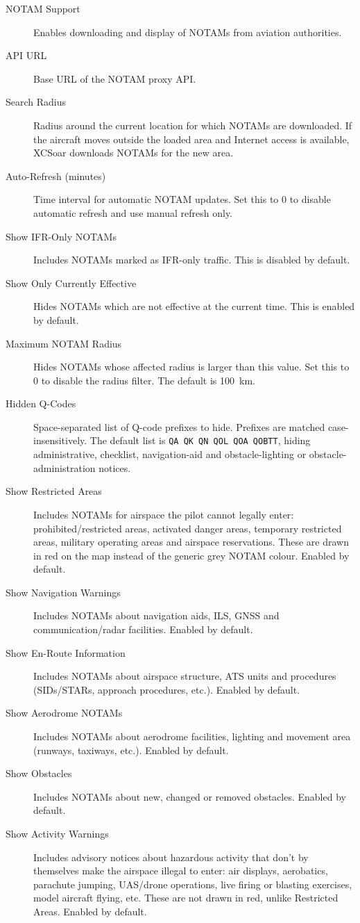 \begin{description}
\item[NOTAM Support]  Enables downloading and display of NOTAMs from
  aviation authorities.
\item[API URL]  Base URL of the NOTAM proxy API.
\item[Search Radius]  Radius around the current location for which NOTAMs
  are downloaded.  If the aircraft moves outside the loaded area and
  Internet access is available, XCSoar downloads NOTAMs for the new area.
\item[Auto-Refresh (minutes)]  Time interval for automatic NOTAM updates.
  Set this to 0 to disable automatic refresh and use manual refresh only.
\item[Show IFR-Only NOTAMs]  Includes NOTAMs marked as IFR-only traffic.
  This is disabled by default.
\item[Show Only Currently Effective]  Hides NOTAMs which are not effective
  at the current time.  This is enabled by default.
\item[Maximum NOTAM Radius]  Hides NOTAMs whose affected radius is larger
  than this value.  Set this to 0 to disable the radius filter.  The
  default is 100~km.
\item[Hidden Q-Codes]  Space-separated list of Q-code prefixes to hide.
  Prefixes are matched case-insensitively.  The default list is
  \texttt{QA QK QN QOL QOA QOBTT}, hiding administrative, checklist,
  navigation-aid and obstacle-lighting or obstacle-administration notices.
\item[Show Restricted Areas]  Includes NOTAMs for airspace the pilot cannot
  legally enter: prohibited/restricted areas, activated danger areas,
  temporary restricted areas, military operating areas and airspace
  reservations.  These are drawn in red on the map instead of the generic
  grey NOTAM colour.  Enabled by default.
\item[Show Navigation Warnings]  Includes NOTAMs about navigation aids,
  ILS, GNSS and communication/radar facilities.  Enabled by default.
\item[Show En-Route Information]  Includes NOTAMs about airspace
  structure, ATS units and procedures (SIDs/STARs, approach procedures,
  etc.).  Enabled by default.
\item[Show Aerodrome NOTAMs]  Includes NOTAMs about aerodrome facilities,
  lighting and movement area (runways, taxiways, etc.).  Enabled by
  default.
\item[Show Obstacles]  Includes NOTAMs about new, changed or removed
  obstacles.  Enabled by default.
\item[Show Activity Warnings]  Includes advisory notices about hazardous
  activity that don't by themselves make the airspace illegal to enter:
  air displays, aerobatics, parachute jumping, UAS/drone operations, live
  firing or blasting exercises, model aircraft flying, etc.  These are
  not drawn in red, unlike Restricted Areas.  Enabled by default.
\end{description}

